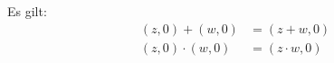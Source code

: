 Es gilt: \begin{align*}
    (z, 0) + (w, 0) &= (z+w, 0) \\
    (z, 0) \cdot (w, 0) &= (z \cdot w, 0)
\end{align*}
